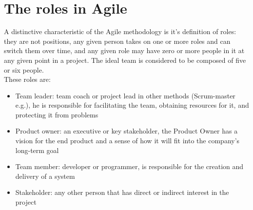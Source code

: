 \section{The roles in Agile}
	A distinctive characteristic of the Agile methodology is it's definition of roles: they are not positions, any given person takes on one or more roles and can switch them over time, and any given role may have zero or more people in it at any given point in a project\cite{agileRoles}.
	The ideal team is considered to be composed of five or six people.\\
	These roles are:
	\begin{itemize}
		\item Team leader: team coach or project lead in other methods (Scrum-master e.g.), he is responsible for facilitating the team, obtaining resources for it, and protecting it from problems
		\item Product owner: an executive or key stakeholder, the Product Owner has a vision for the end product and a sense of how it will fit into the company’s long-term goal
		\item Team member: developer or programmer, is responsible for the creation and delivery of a system
		\item Stakeholder: any other person that has direct or indirect interest in the project
	\end{itemize}

